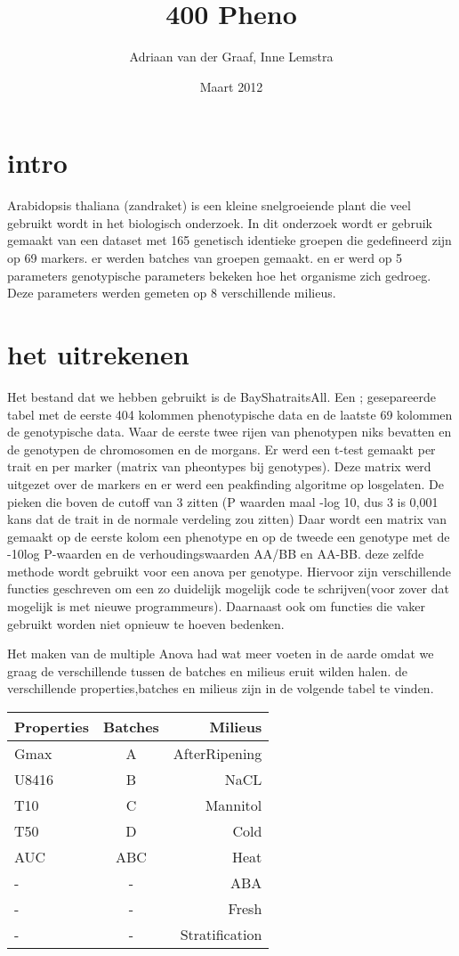 \documentclass[10pt,a4paper, twocollumn]{article}
\author{Adriaan van der Graaf, Inne Lemstra}
\title{400 Pheno}
\date{Maart 2012}
\begin{document}
  \maketitle
\section  {intro}
Arabidopsis thaliana (zandraket) is een kleine snelgroeiende plant die veel gebruikt wordt in het biologisch onderzoek.
In dit onderzoek wordt er gebruik gemaakt van een dataset met 165 genetisch identieke groepen die gedefineerd zijn op 69 markers.
er werden batches van groepen gemaakt. en er werd op 5 parameters genotypische parameters bekeken hoe het organisme zich gedroeg.
Deze parameters werden gemeten op 8 verschillende milieus.\\

\section{het uitrekenen}
Het bestand dat we hebben gebruikt is de BayShatraitsAll. 
Een ; gesepareerde tabel met de eerste 404 kolommen phenotypische data en de laatste 69 kolommen de genotypische data.
Waar de eerste twee rijen van phenotypen niks bevatten en de genotypen de chromosomen en de morgans.
Er werd een t-test gemaakt per trait en per marker (matrix van pheontypes bij genotypes).
Deze matrix werd uitgezet over de markers en er werd een peakfinding algoritme op losgelaten. 
De pieken die boven de cutoff van 3 zitten (P waarden maal -log 10, dus 3 is 0,001 kans dat de trait in de normale verdeling zou zitten)
Daar wordt een matrix van gemaakt op de eerste kolom een phenotype en op de tweede een genotype met de -10log P-waarden en de  verhoudingswaarden AA/BB en AA-BB.
deze zelfde methode wordt gebruikt voor een anova per genotype. 
Hiervoor zijn verschillende functies geschreven om een zo duidelijk mogelijk code te schrijven(voor zover dat mogelijk is met nieuwe programmeurs).
Daarnaast ook om functies die vaker gebruikt worden niet opnieuw te hoeven bedenken.

Het maken van de multiple Anova had wat meer voeten in de aarde omdat we graag de verschillende tussen de batches en milieus eruit wilden halen.
de verschillende properties,batches en milieus zijn in de volgende tabel te vinden.

\begin{tabular} {l | c | r}
\hline
Properties & Batches & Milieus\\ 
\hline \hline
Gmax & A & AfterRipening\\
U8416 & B & NaCL\\
T10 & C & Mannitol\\
T50 & D & Cold\\
AUC & ABC & Heat\\
- & - & ABA\\
- & - & Fresh\\
 -& - & Stratification\\
 \hline
\end{tabular}
\end{document}
